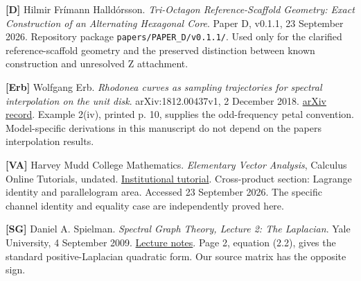 \documentclass[
  11pt,
  a4paper,
]{article}
\begin{document}
\textbf{{[}D{]}} Hilmir Frímann Halldórsson. \emph{Tri-Octagon Reference-Scaffold Geometry: Exact Construction of an Alternating Hexagonal Core}. Paper D, v0.1.1, 23 September 2026. Repository package \texttt{papers/PAPER\_D/v0.1.1/}. Used only for the clarified reference-scaffold geometry and the preserved distinction between known construction and unresolved Z attachment.

\textbf{{[}Erb{]}} Wolfgang Erb. \emph{Rhodonea curves as sampling trajectories for spectral interpolation on the unit disk}. arXiv:1812.00437v1, 2 December 2018. \href{https://arxiv.org/abs/1812.00437v1}{arXiv record}. Example 2(iv), printed p. 10, supplies the odd-frequency petal convention. Model-specific derivations in this manuscript do not depend on the paper\textquotesingle s interpolation results.

\textbf{{[}VA{]}} Harvey Mudd College Mathematics. \emph{Elementary Vector Analysis}, Calculus Online Tutorials, undated. \href{https://math.hmc.edu/calculus/hmc-mathematics-calculus-online-tutorials/multivariable-calculus/elementary-vector-analysis/}{Institutional tutorial}. Cross-product section: Lagrange identity and parallelogram area. Accessed 23 September 2026. The specific channel identity and equality case are independently proved here.

\textbf{{[}SG{]}} Daniel A. Spielman. \emph{Spectral Graph Theory, Lecture 2: The Laplacian}. Yale University, 4 September 2009. \href{https://www.cs.yale.edu/homes/spielman/561/2009/lect02-09.pdf}{Lecture notes}. Page 2, equation (2.2), gives the standard positive-Laplacian quadratic form. Our source matrix has the opposite sign.
\end{document}
